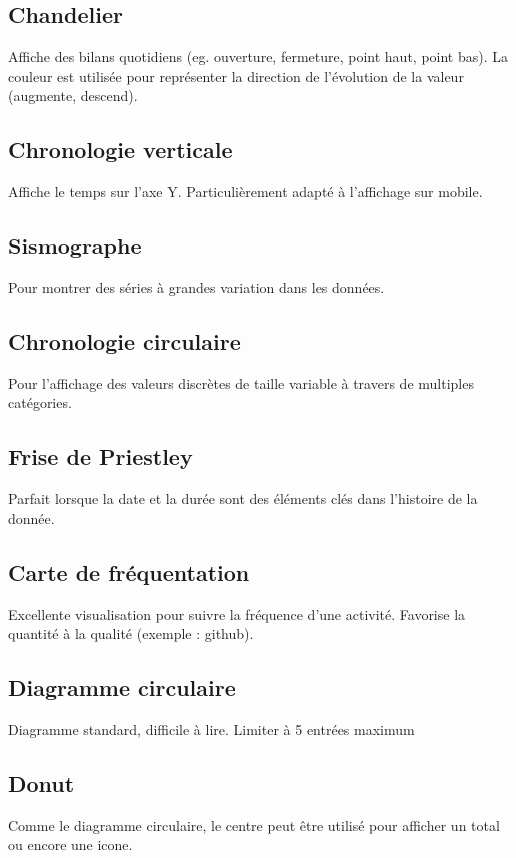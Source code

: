 \documentclass[a4paper,12pt]{article}
\begin{document}
\begin{multicols}{2}
\subsection*{Chandelier}
\label{sec:orgff99917}
Affiche des bilans quotidiens (eg. ouverture, fermeture, point haut, point bas). \autocite{alansmithLexiqueVisuel}
La couleur est utilisée pour représenter la direction de l'évolution de la valeur (augmente, descend).
\subsection*{Chronologie verticale}
\label{sec:org6dac254}
Affiche le temps sur l'axe Y. Particulièrement adapté à l'affichage sur mobile. \autocite{alansmithLexiqueVisuel}
\subsection*{Sismographe}
\label{sec:org2744856}
Pour montrer des séries à grandes variation dans les données. \autocite{alansmithLexiqueVisuel}
\subsection*{Chronologie circulaire}
\label{sec:org9fa0d7a}
Pour l'affichage des valeurs discrètes de taille variable à travers de multiples catégories. \autocite{alansmithLexiqueVisuel}
\subsection*{Frise de Priestley}
\label{sec:org4738d67}
Parfait lorsque la date et la durée sont des éléments clés dans l'histoire de la donnée. \autocite{alansmithLexiqueVisuel}
\subsection*{Carte de fréquentation}
\label{sec:org25b08eb}
Excellente visualisation pour suivre la fréquence d'une activité. Favorise la quantité à la qualité (exemple : github). \autocite{alansmithLexiqueVisuel}
\subsection*{Diagramme circulaire}
\label{sec:org337db78}
Diagramme standard, difficile à lire. \autocite{alansmithLexiqueVisuel}
Limiter à 5 entrées maximum \autocite{mikeyiHowChooseRight2020}
\subsection*{Donut}
\label{sec:org8daa27f}
Comme le diagramme circulaire, le centre peut être utilisé pour afficher un total ou encore une icone. \autocite{alansmithLexiqueVisuel}

\end{multicols}
\end{document}
